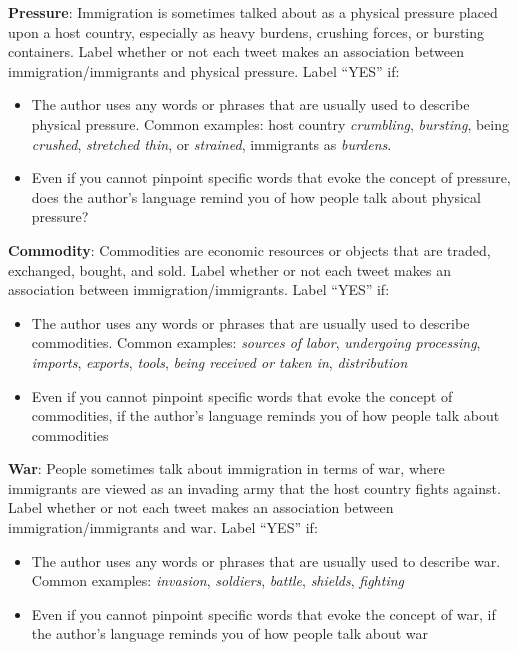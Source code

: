 \begin{table*}[htbp!]
\begin{tcolorbox}[colback=white, colframe=white!30!black, boxrule=1pt, arc=4mm, width=\textwidth, boxrule=1pt,title=Codebook,fontupper=\footnotesize]
\textbf{Pressure}: Immigration is sometimes talked about as a physical pressure placed upon a host country, especially as heavy burdens, crushing forces, or bursting containers. Label whether or not each tweet makes an association between immigration/immigrants and physical pressure. Label “YES” if: 
\begin{itemize}[noitemsep, topsep=0pt]
    \item The author uses any words or phrases that are usually used to describe physical pressure. Common examples: host country \textit{crumbling}, \textit{bursting}, being \textit{crushed}, \textit{stretched thin}, or \textit{strained}, immigrants as \textit{burdens}.
    \item Even if you cannot pinpoint specific words that evoke the concept of pressure, does the author’s language remind you of how people talk about physical pressure? 
\end{itemize}

\textbf{Commodity}: Commodities are economic resources or objects that are traded, exchanged, bought, and sold. Label whether or not each tweet makes an association between immigration/immigrants. Label ``YES'' if:
\begin{itemize}[noitemsep, topsep=0pt]
    \item The author uses any words or phrases that are usually used to describe commodities. Common examples: \textit{sources of labor}, \textit{undergoing processing}, \textit{imports}, \textit{exports}, \textit{tools}, \textit{being received or taken in}, \textit{distribution}
    \item Even if you cannot pinpoint specific words that evoke the concept of commodities, if the author's language reminds you of how people talk about commodities
\end{itemize}

\textbf{War}: People sometimes talk about immigration in terms of war, where immigrants are viewed as an invading army that the host country fights against. Label whether or not each tweet makes an association between immigration/immigrants and war. Label “YES” if:
\begin{itemize}[noitemsep, topsep=0pt]
    \item The author uses any words or phrases that are usually used to describe war. Common examples: \textit{invasion}, \textit{soldiers}, \textit{battle}, \textit{shields}, \textit{fighting}
    \item Even if you cannot pinpoint specific words that evoke the concept of war, if the author's language reminds you of how people talk about war
\end{itemize}


\end{tcolorbox}
\end{table*}
